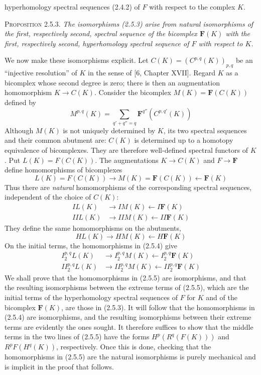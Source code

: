 
\noindent hyperhomology spectral sequences (2.4.2) of $F$ with respect to the
complex $K$.

\textsc{Proposition 2.5.3.} \textit{The isomorphisms \textup{(2.5.3)}
arise from natural isomorphisms of the first, respectively second, spectral
sequence of the bicomplex $\mathbf F(K)$ with the first, respectively second,
hyperhomology spectral sequence of $F$ with respect to $K$.}

We now make these isomorphisms explicit. Let
$C(K)=(C^{p,q}(K))_{p,q}$ be an \textquotedblleft injective
resolution\textquotedblright{} of $K$ in the sense of [6, Chapter XVII].
Regard $K$ as a bicomplex whose second degree is zero; there is then an
augmentation homomorphism $K\to C(K)$. Consider the bicomplex
$M(K)=\mathbf F(C(K))$ defined by
\[
M^{p,q}(K)=\sum_{q'+q''=q}\mathbf F^{q''}(C^{p,q'}(K))
\]
Although $M(K)$ is not uniquely determined by $K$, its two spectral sequences
and their common abutment are: $C(K)$ is determined up to a homotopy
equivalence of bicomplexes. They are therefore well-defined spectral functors
of $K$. Put $L(K)=F(C(K))$. The augmentations
$K\to C(K)$ and $F\to\mathbf F$ define
homomorphisms of bicomplexes
\[
L(K)=F(C(K))\to M(K)=\mathbf F(C(K))
\leftarrow\mathbf F(K)
\]
Thus there are \textit{natural} homomorphisms of the corresponding spectral sequences,
independent of the choice of $C(K)$:
\[
\tag{2.5.4}
\begin{aligned}
I L(K)&\to I M(K)\leftarrow I\mathbf F(K)\\
IIL(K)&\to IIM(K)\leftarrow II\mathbf F(K)
\end{aligned}
\]
They define the same homomorphisms on the abutments,
\[
HL(K)\to HM(K)\leftarrow H\mathbf F(K)
\]
On the initial terms, the homomorphisms in (2.5.4) give
\[
\tag{2.5.5}
\begin{aligned}
I_2^{p,q}L(K)&\to I_2^{p,q}M(K)
\leftarrow I_2^{p,q}\mathbf F(K)\\
II_2^{p,q}L(K)&\to II_2^{p,q}M(K)
\leftarrow II_2^{p,q}\mathbf F(K)
\end{aligned}
\]
We shall prove that the homomorphisms in (2.5.5) are isomorphisms, and that
the resulting isomorphisms between the extreme terms of (2.5.5), which are
the initial terms of the hyperhomology spectral sequences of $F$ for $K$ and
of the bicomplex $\mathbf F(K)$, are those in (2.5.3). It will follow that
the homomorphisms in (2.5.4) are isomorphisms, and the resulting isomorphisms
between their extreme terms are evidently the ones sought. It therefore suffices to
show that the middle terms in the two lines of (2.5.5) have the forms
$H^p(R^q(F(K)))$ and $R^pF(H^q(K))$, respectively. Once this is done,
checking that the homomorphisms in (2.5.5) are the natural isomorphisms is
purely mechanical and is implicit in the proof that follows.

